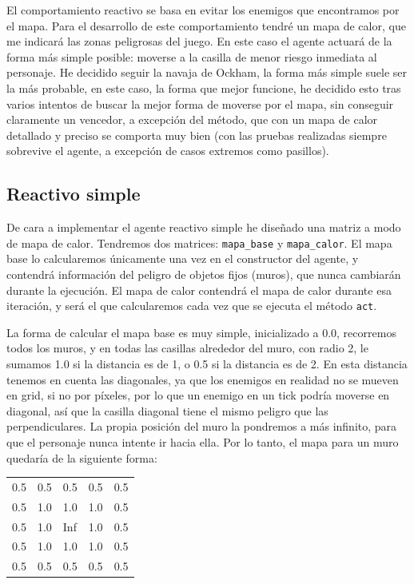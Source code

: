 \documentclass[10pt, spanish]{article}
\begin{document}
El comportamiento reactivo se basa en evitar los enemigos que encontramos por el mapa. Para el desarrollo de este comportamiento tendré un mapa de calor, que me indicará las zonas peligrosas del juego. En este caso el agente actuará de la forma más simple posible: moverse a la casilla de menor riesgo inmediata al personaje. He decidido seguir la navaja de Ockham, la forma más simple suele ser la más probable, en este caso, la forma que mejor funcione, he decidido esto tras varios intentos de buscar la mejor forma de moverse por el mapa, sin conseguir claramente un vencedor, a excepción del método, que con un mapa de calor detallado y preciso se comporta muy bien (con las pruebas realizadas siempre sobrevive el agente, a excepción de casos extremos como pasillos).

\subsection{Reactivo simple}

De cara a implementar el agente reactivo simple he diseñado una matriz a modo de mapa de calor. Tendremos dos matrices: \texttt{mapa\_base} y \texttt{mapa\_calor}. El mapa base lo calcularemos únicamente una vez en el constructor del agente, y contendrá información del peligro de objetos fijos (muros), que nunca cambiarán durante la ejecución. El mapa de calor contendrá el mapa de calor durante esa iteración, y será el que calcularemos cada vez que se ejecuta el método \texttt{act}.

La forma de calcular el mapa base es muy simple, inicializado a 0.0, recorremos todos los muros, y en todas las casillas alrededor del muro, con radio 2, le sumamos 1.0 si la distancia es de 1, o 0.5 si la distancia es de 2. En esta distancia tenemos en cuenta las diagonales, ya que los enemigos en realidad no se mueven en grid, si no por píxeles, por lo que un enemigo en un tick podría moverse en diagonal, así que la casilla diagonal tiene el mismo peligro que las perpendiculares. La propia posición del muro la pondremos a más infinito, para que el personaje nunca intente ir hacia ella. Por lo tanto, el mapa para un muro quedaría de la siguiente forma:

\begin{table}[H]
\centering
\begin{tabular}{lllll}
0.5 & 0.5 & 0.5 & 0.5 & 0.5                     \\
0.5 & 1.0 & 1.0 & 1.0 & 0.5                     \\
0.5 & 1.0 & Inf    & 1.0 & 0.5                     \\
0.5 & 1.0 & 1.0 & 1.0 & 0.5                     \\
0.5 & 0.5 & 0.5 & 0.5 & \multicolumn{1}{c}{0.5}
\end{tabular}
\end{table}
\end{document}
